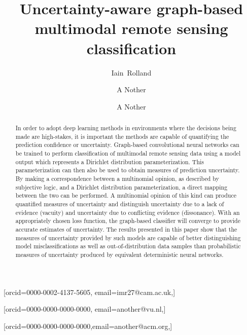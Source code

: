 \documentclass[
twocolumn,
]{ceurart}
\begin{document}


\title{Uncertainty-aware graph-based multimodal remote sensing classification}

\author[1]{Iain~Rolland}[orcid=0000-0002-4137-5605, email=imr27@cam.ac.uk,]

\address[1]{Department of Engineering, University of Cambridge, Cambridge, CB2 1PZ United Kingdom}
\address[2]{Department of Physics and Technology, UiT the Arctic University of Norway, P.O. box 6050 Langnes, NO-9037, Tromsø, Norway}

\author[1]{A Nother}[orcid=0000-0000-0000-0000, email=another@vu.nl,]

\author[1]{A Nother}[orcid=0000-0000-0000-0000,email=another@acm.org,]

\begin{abstract}
In order to adopt deep learning methods in environments where the decisions being made are high-stakes, it is important the methods are capable of quantifying the prediction confidence or uncertainty.
Graph-based convolutional neural networks can be trained to perform classification of multimodal remote sensing data using a model output which represents a Dirichlet distribution parameterization.
This parameterization can then also be used to obtain measures of prediction uncertainty.
By making a correspondence between a multinomial opinion, as described by subjective logic, and a Dirichlet distribution parameterization, a direct mapping between the two can be performed.
A multinomial opinion of this kind can produce quantified measures of uncertainty and distinguish uncertainty due to a lack of evidence (vacuity) and uncertainty due to conflicting evidence (dissonance).
With an appropriately chosen loss function, the graph-based classifier will converge to provide accurate estimates of uncertainty.
The results presented in this paper show that the measures of uncertainty provided by such models are capable of better distinguishing model misclassifications as well as out-of-distribution data samples than probabilistic measures of uncertainty produced by equivalent deterministic neural networks.
\end{abstract}
\end{document}
